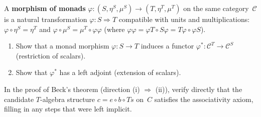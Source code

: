 \begin{exercise}\label{exer:monad-maps}
A \textbf{morphism of monads} $\varphi\colon(S,\eta^S,\mu^S)\to
(T,\eta^T,\mu^T)$ on the same category~$\mathcal{C}$ is a natural
transformation $\varphi\colon S\Rightarrow T$ compatible with units and
multiplications:
$\varphi\circ\eta^S = \eta^T$ and
$\varphi\circ\mu^S = \mu^T\circ\varphi\varphi$
(where $\varphi\varphi = \varphi T\circ S\varphi = T\varphi\circ\varphi S$).
\begin{enumerate}[label=(\alph*)]
\item Show that a monad morphism $\varphi\colon S\to T$ induces a functor
    $\varphi^*\colon\mathcal{C}^T\to\mathcal{C}^S$ (restriction of scalars).
\item Show that $\varphi^*$ has a left adjoint (extension of scalars).
\end{enumerate}
\end{exercise}

\begin{exercise}\label{exer:monad-coequaliser-detail}
In the proof of Beck's theorem (direction (i) $\Rightarrow$ (ii)),
verify directly that the candidate $T$-algebra structure
$c = e\circ b\circ Ts$ on~$C$ satisfies the associativity axiom, filling
in any steps that were left implicit.
\end{exercise}

